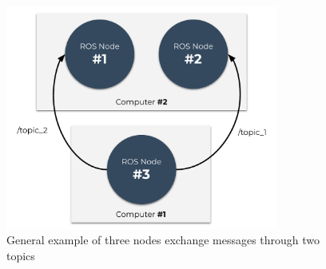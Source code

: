 \begin{figure}[H]
    \centering
    \includegraphics[width=0.8\textwidth]{background/figures/ros_nodes.pdf}
    \caption{General example of three nodes exchange messages through two topics}
    \label{fig:background:ros_nodes}
\end{figure}


